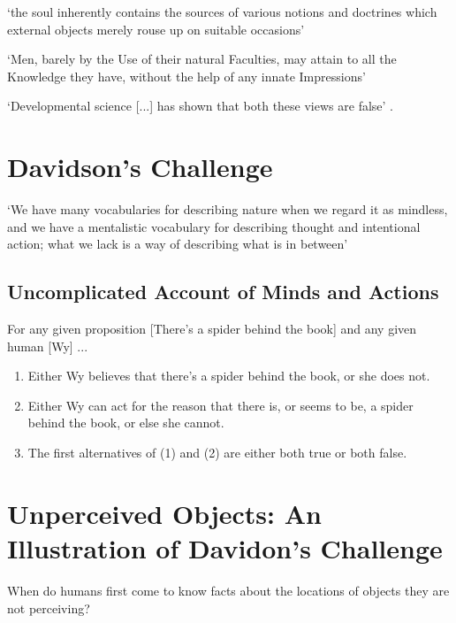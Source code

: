 \documentclass[12pt]{extarticle}
\begin{document}
\begin{multicols}{3}
‘the soul inherently contains the sources of various notions and doctrines which external objects merely rouse up on suitable occasions’
\citep[p.\ 48]{Leibniz:1996bl}

‘Men, barely by the Use of their natural Faculties, may attain to all the Knowledge
they have, without the help of any innate Impressions’
\citep[p.\ 48]{Locke:1975qo}

‘Developmental science [...] has shown that both these views are false’
\citep[p.\ 89]{Spelke:2007hb}.



\section{Davidson’s Challenge}

‘We have many vocabularies for describing nature when we regard it as mindless, and we have a mentalistic vocabulary for describing thought and intentional action; what we lack is a way of describing what is in between’ \citep[p.\ 11]{Davidson:1999ju}

\subsection{Uncomplicated Account of Minds and Actions}
For any given proposition [There’s a spider behind the book] and any given human [Wy]
...
\begin{enumerate}
\item Either Wy believes that there’s a spider behind the book, or she does not.
\item Either Wy can act for the reason that there is, or seems to be, a spider behind the book, or else she cannot.
\item The first alternatives of (1) and (2) are either both true or both false.
\end{enumerate}



\section{Unperceived Objects: An Illustration of Davidon's Challenge}

When do humans first come to know facts about the locations of objects they are not
perceiving?


\end{multicols}
\end{document}
